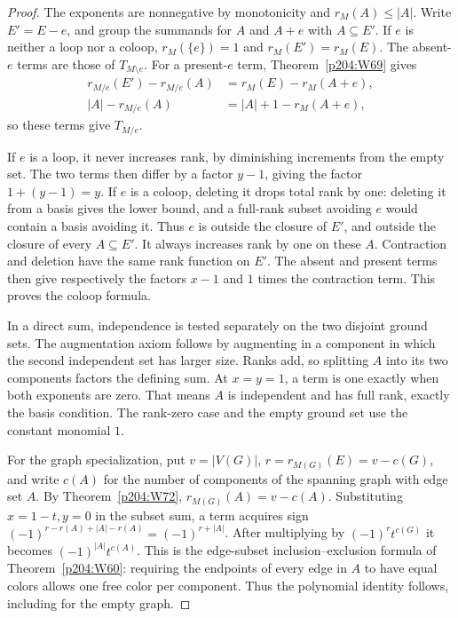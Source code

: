 \documentclass[11pt,oneside,openany]{book}
\theoremstyle{plain}
\theoremstyle{definition}
\theoremstyle{remark}
\begin{document}
\begin{proof}
The exponents are nonnegative by monotonicity and
\(r_M(A)\le|A|\). Write \(E'=E-e\), and group the summands
for \(A\) and \(A+e\) with \(A\subseteq E'\). If \(e\) is
neither a loop nor a coloop, \(r_M(\{e\})=1\) and
\(r_M(E')=r_M(E)\). The absent-\(e\) terms are those of
\(T_{M\setminus e}\). For a present-\(e\) term,
Theorem~\ref{p204:W69} gives
\[
 \begin{split}
 r_{M/e}(E')-r_{M/e}(A)&=r_M(E)-r_M(A+e),\\
 |A|-r_{M/e}(A)&=|A|+1-r_M(A+e),
 \end{split}
\]
so these terms give \(T_{M/e}\).

If \(e\) is a loop, it never increases rank, by diminishing
increments from the empty set. The two terms then differ by
a factor \(y-1\), giving the factor \(1+(y-1)=y\).
If \(e\) is a coloop, deleting it drops total rank by one:
deleting it from a basis gives the lower bound, and a
full-rank subset avoiding \(e\) would contain a basis
avoiding it. Thus \(e\) is outside the closure of \(E'\),
and outside the closure of every \(A\subseteq E'\).
It always increases rank by one on these \(A\). Contraction
and deletion have the same rank function on \(E'\).
The absent and present terms then give respectively the
factors \(x-1\) and \(1\) times the contraction term.
This proves the coloop formula.

In a direct sum, independence is tested separately on the
two disjoint ground sets. The augmentation axiom follows
by augmenting in a component in which the second
independent set has larger size. Ranks add, so splitting
\(A\) into its two components factors the defining sum.
At \(x=y=1\), a term is one exactly when both exponents
are zero. That means \(A\) is independent and has full
rank, exactly the basis condition. The rank-zero case and
the empty ground set use the constant monomial \(1\).

For the graph specialization, put \(v=|V(G)|\),
\(r=r_{M(G)}(E)=v-c(G)\), and write \(c(A)\) for the
number of components of the spanning graph with edge set
\(A\). By Theorem~\ref{p204:W72}, \(r_{M(G)}(A)=v-c(A)\).
Substituting \(x=1-t,y=0\) in the subset sum, a term
acquires sign \((-1)^{r-r(A)+|A|-r(A)}=(-1)^{r+|A|}\).
After multiplying by \((-1)^r t^{c(G)}\) it becomes
\((-1)^{|A|}t^{c(A)}\). This is the edge-subset
inclusion--exclusion formula of Theorem~\ref{p204:W60}:
requiring the endpoints of every edge in \(A\) to have
equal colors allows one free color per component.
Thus the polynomial identity follows, including for
the empty graph.
\end{proof}
\end{document}
